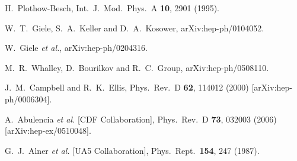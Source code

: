 \documentclass[12pt]{iopart}
\begin{document}
\begin{thebibliography}{99}

  H.~Plothow-Besch,
  Int.\ J.\ Mod.\ Phys.\ A {\bf 10}, 2901 (1995).

  W.~T.~Giele, S.~A.~Keller and D.~A.~Kosower,
  arXiv:hep-ph/0104052.

  W.~Giele {\it et al.},
  arXiv:hep-ph/0204316.

  M.~R.~Whalley, D.~Bourilkov and R.~C.~Group,
  arXiv:hep-ph/0508110.

  J.~M.~Campbell and R.~K.~Ellis,
  Phys.\ Rev.\ D {\bf 62}, 114012 (2000)
  [arXiv:hep-ph/0006304].






  A.~Abulencia {\it et al.}  [CDF Collaboration],
  Phys.\ Rev.\ D {\bf 73}, 032003 (2006)
  [arXiv:hep-ex/0510048].

  G.~J.~Alner {\it et al.}  [UA5 Collaboration],
  Phys.\ Rept.\  {\bf 154}, 247 (1987).


\end{thebibliography}
\end{document}
